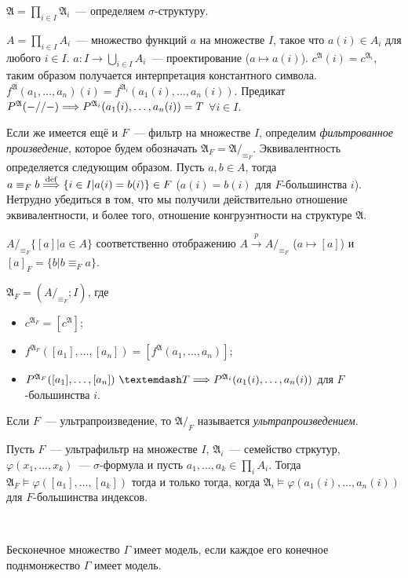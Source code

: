 \begin{definition}
    $\mathfrak{A} = \prod_{i \in I} \mathfrak{A}_i$~— определяем $\sigma$-структуру.  
    
    $A = \prod_{i \in I} A_i$~— множество функций $a$ на множестве $I$, такое что $a(i) \in A_i$ для любого $i \in I$. $a : I \to \bigcup_{i \in I} A_i$~— проектирование ($a \mapsto a(i)$). $c^{\mathfrak{A}}(i) = c^{\mathfrak{A}_i}$, таким образом получается интерпретация константного символа. $f^{\mathfrak{A}}(a_1, \ldots, a_n)(i) = f^{\mathfrak{A}_i}(a_1(i), \ldots, a_n(i))$. Предикат $P^{\mathfrak{A}}(-//-) \Longrightarrow P^{\mathfrak{A}_i}(a_1(i), \ldots, a_n(i)) = T$ $\forall i \in I$. 

    Если же имеется ещё и $F$~— фильтр на множестве $I$, определим \textit{фильтрованное произведение}, которое будем обозначать $\mathfrak{A}_F = \mathfrak{A} /_{\equiv_F}$. Эквивалентность определяется следующим образом. Пусть $a, b \in A$, тогда $a \equiv_F b \overset{\mathrm{def}}{\Longrightarrow} \{i \in I | a(i) = b(i)\} \in F$ ($a(i) = b(i)$ для $F$-большинства $i$). Нетрудно убедиться в том, что мы получили действительно отношение эквивалентности, и более того, отношение конгруэнтности на структуре $\mathfrak{A}$.  

    $A /_{\equiv_F} \{[a] | a \in A\}$ соответственно отображению $A \xrightarrow{p} A /_{\equiv_F}$ ($a \mapsto [a]$) и $[a]_F = \{b | b \equiv_F a\}$.  
    
    $\mathfrak{A}_F = (A /_{\equiv_F}; I)$, где 

    \begin{itemize}
        \item $c^{\mathfrak{A}_F} = [c^{\mathfrak{A}}]$; 
        \item $f^{\mathfrak{A}_F}([a_1], \ldots, [a_n]) = [f^{\mathfrak{A}}(a_1, \ldots, a_n)]$; 
        \item $P^{\mathfrak{A}_F}([a_1], \ldots, [a_n])~— T \Lra P^{\mathfrak{A}_i} (a_1(i), \ldots, a_n(i))$ для $F$-большинства $i$. 
    \end{itemize} 

    Если $F$~— ультрапроизведение, то $\mathfrak{A} /_{F}$ называется \textit{ультрапроизведением}.
\end{definition} 

\begin{theorem}[об ультрапроизведениях]
    Пусть $F$~— ультрафильтр на множестве $I$, $\mathfrak{A}_i$~— семейство стркутур, $\varphi(x_1, \ldots, x_k)$~— $\sigma$-формула и пусть $a_1, \ldots, a_k \in \prod_i A_i$. Тогда $\mathfrak{A}_F \models \varphi([a_1], \ldots, [a_k])$ тогда и только тогда, когда $\mathfrak{A}_i \models \varphi(a_1(i), \ldots, a_n(i))$ для $F$-большинства индексов.
\end{theorem} \ 

\begin{theorem}
    Бесконечное множество $\Gamma$ имеет модель, если каждое его конечное поднмонжество $\Gamma$ имеет модель.
\end{theorem}




